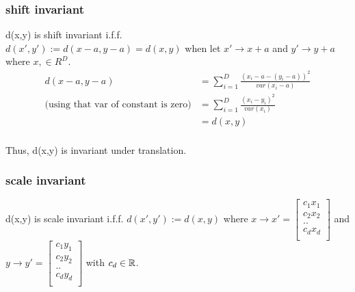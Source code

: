 


\subsubsection*{shift invariant} %
\label{ssub:shift invariant}
d(x,y) is shift invariant i.f.f. \\ 
$d({x}',{y}') := d(x-a,y-a) = d(x,y)$  
when 
let ${x}' \rightarrow x + a$ and ${y}' \rightarrow y + a$ where $x, \in R^{D}$. \newline 
\begin{align}
d(x-a,y-a) 
&=\sum_{i=1}^{D}\frac{(x_i - a - (y_i - a))^2}{var(x_i-a)} \\
\text{(using that var of constant is zero)} &=\sum_{i=1}^{D}\frac{(x_i - y_i)^2}{var(x_i)} \\
&= d(x,y) \\
\end{align}

Thus, d(x,y) is invariant under translation.


\subsubsection*{scale invariant} %
\label{ssub:scale invariant}
d(x,y) is scale invariant i.f.f. \newline
$d({x}',{y}') := d(x,y)$
where  $x \rightarrow {x}' =
\begin{bmatrix}
	c_{1}x_{1}\\ 
	c_{2}x_{2}\\ 
	..\\ 
	c_{d}x_{d} \\ 
\end{bmatrix}$
and 
$y \rightarrow {y}' = 
\begin{bmatrix}
	c_{1}y_{1}\\ 
	c_{2}y_{2}\\ 
	..\\ 
	c_{d}y_{d} \\ 
\end{bmatrix}$
with $c_{d} \in \mathbb{R}$. \newline

